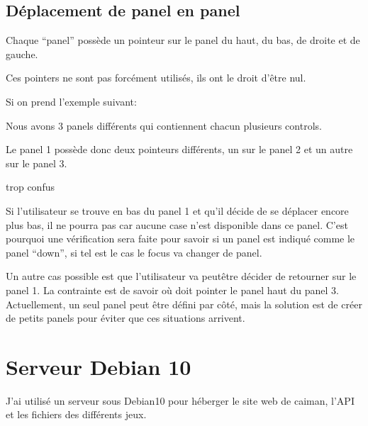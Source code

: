 \documentclass[a4paper,12pt,french]{sphinxmanual}
\begin{document}
\subsection{Déplacement de panel en panel}
\label{\detokenize{fonctionnelle:deplacement-de-panel-en-panel}}
\sphinxAtStartPar
Chaque “panel” possède un pointeur sur le panel du haut, du bas, de droite et de gauche.

\sphinxAtStartPar
Ces pointers ne sont pas forcément utilisés, ils ont le droit d’être nul.

\sphinxAtStartPar
Si on prend l’exemple suivant:

\sphinxAtStartPar
{}

\sphinxAtStartPar
Nous avons 3 panels différents qui contiennent chacun plusieurs controls.

\sphinxAtStartPar
Le panel 1 possède donc deux pointeurs différents, un sur le panel 2 et un autre sur le panel 3.

\sphinxAtStartPar
trop confus

\sphinxAtStartPar
Si l’utilisateur se trouve en bas du panel 1 et qu’il décide de se déplacer encore plus  bas, il ne pourra pas car aucune case n’est disponible dans ce panel. C’est pourquoi une vérification  sera faite pour savoir si un panel est indiqué comme le panel “down”, si tel est le cas le focus va changer de panel.

\sphinxAtStartPar
Un autre cas possible est que l’utilisateur va peut\sphinxhyphen{}être décider de retourner sur le panel 1. La contrainte est de savoir où doit pointer le panel haut du panel 3. Actuellement, un seul panel peut être défini par côté, mais la solution est de créer de petits panels pour éviter que ces situations arrivent.


\section{Serveur Debian 10}
\label{\detokenize{fonctionnelle:serveur-debian-10}}
\sphinxAtStartPar
J’ai utilisé un serveur sous Debian10 pour héberger le site web de caiman, l’API et les fichiers des différents jeux.
\end{document}
